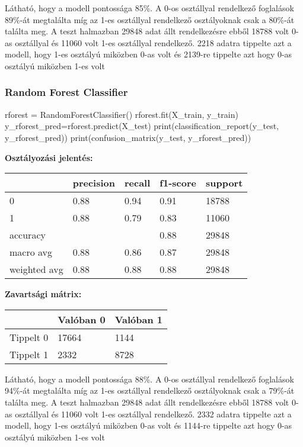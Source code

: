 Látható, hogy a modell pontossága 85\%. A 0-os osztállyal rendelkező foglalások 89\%-át megtalálta míg az 1-es osztállyal rendelkező osztályoknak csak a 80\%-át találta meg. A teszt halmazban 29848 adat állt rendelkezésre ebből 18788 volt 0-as osztállyal és 11060 volt 1-es osztállyal rendelkező. 2218 adatra tippelte azt a modell, hogy 1-es osztályú miközben 0-as volt és 2139-re tippelte azt hogy 0-as osztályú miközben 1-es volt

\subsubsection{Random Forest Classifier}
\begin{python}
rforest = RandomForestClassifier()
rforest.fit(X_train, y_train)
y_rforest_pred=rforest.predict(X_test)
print(classification_report(y_test, y_rforest_pred))
print(confusion_matrix(y_test, y_rforest_pred))
\end{python}

\textbf{Osztályozási jelentés:}

\begin{tabular}{|l|l|l|l|l|}
\hline
             & precision & recall & f1-score & support \\
\hline
0            & 0.88      & 0.94   & 0.91     & 18788   \\
\hline
1            & 0.88      & 0.79   & 0.83     & 11060   \\
\hline
accuracy     &           &        & 0.88     & 29848   \\
\hline
macro avg    & 0.88      & 0.86   & 0.87     & 29848   \\
\hline
weighted avg & 0.88      & 0.88   & 0.88     & 29848  \\
\hline
\end{tabular}

\textbf{Zavartsági mátrix:}

\begin{tabular}{|l|l|l|}
\hline
          & Valóban 0 & Valóban 1 \\
         \hline
Tippelt 0 & 17664     & 1144      \\
\hline
Tippelt 1 & 2332      & 8728   \\
\hline
\end{tabular}

Látható, hogy a modell pontossága 88\%. A 0-os osztállyal rendelkező foglalások 94\%-át megtalálta míg az 1-es osztállyal rendelkező osztályoknak csak a 79\%-át találta meg. A teszt halmazban 29848 adat állt rendelkezésre ebből 18788 volt 0-as osztállyal és 11060 volt 1-es osztállyal rendelkező. 2332 adatra tippelte azt a modell, hogy 1-es osztályú miközben 0-as volt és 1144-re tippelte azt hogy 0-as osztályú miközben 1-es volt

